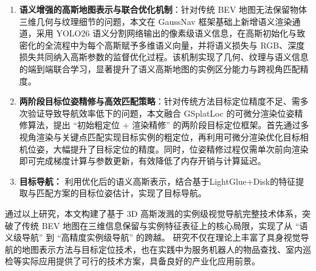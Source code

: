 \begin {enumerate}
\item \textbf {语义增强的高斯地图表示与联合优化机制}：针对传统 BEV 地图无法保留物体三维几何与纹理细节的问题，本文在 GaussNav\cite{gaussnav} 框架基础上新增语义渲染通道，采用 YOLO26\cite{Yolo26} 语义分割网络输出的像素级语义信息，在高斯初始化与致密化的全流程中为每个高斯赋予多维语义向量，并将语义损失与 RGB、深度损失共同纳入高斯参数的监督优化过程。该机制实现了几何、纹理与语义信息的端到端联合学习，显著提升了语义高斯地图的实例区分能力与跨视角匹配精度。
\item \textbf {两阶段目标位姿精修与高效匹配策略}：针对传统方法目标定位精度不足、需多次验证导致导航效率低下的问题，本文融合 GSplatLoc\cite{gsplatloc} 的可微分渲染位姿精修算法，提出 “初始粗定位 + 渲染精修” 的两阶段目标定位框架。首先通过多视角渲染与关键点匹配实现目标实例的粗定位，再利用可微分渲染优化目标相机位姿，大幅提升了目标定位的精度。同时，位姿精修过程仅需单次前向渲染即可完成梯度计算与参数更新，有效降低了内存开销与计算延迟。
\item \textbf{目标导航：} 利用优化后的语义高斯表示，结合基于LightGlue+Disk\cite{lightglue,disk}的特征提取与匹配方案的目标位姿估计，实现了目标导航。
\end {enumerate}
通过以上研究，本文构建了基于 3D 高斯泼溅的实例级视觉导航完整技术体系，突破了传统 BEV 地图在三维信息保留与实例特征表征上的核心局限，实现了从 “语义级导航” 到 “高精度实例级导航” 的跨越。
研究不仅在理论上丰富了具身视觉导航的地图表示方法与目标定位技术，也在实践中为服务机器人的物品查找、室内巡检等实际应用提供了可行的技术方案，具备良好的产业化应用前景。

